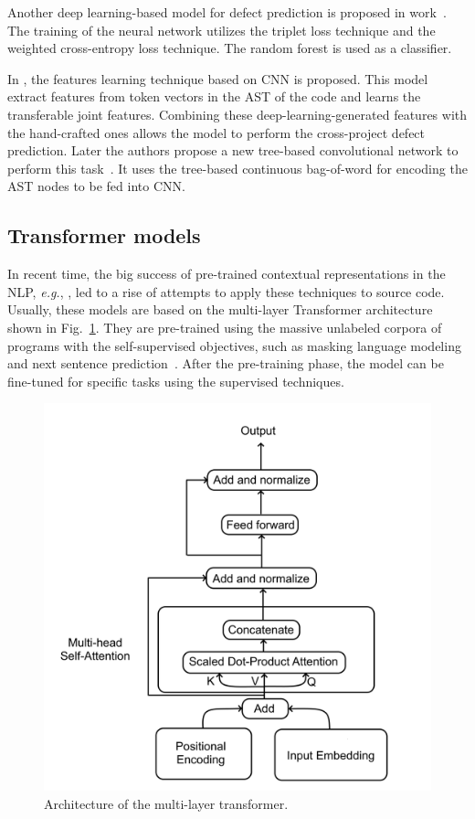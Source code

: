 \documentclass[mathematics,review,submit,moreauthors,pdftex]{Definitions/mdpi}
\begin{document}
Another deep learning-based model for defect prediction is proposed in work~\cite{XuEtAl2019}. The training of the neural network utilizes the triplet loss technique and the weighted cross-entropy loss technique. The random forest is used as a classifier.

In \cite{QiuLuCaiJiang2019}, the features learning technique based on CNN is proposed. This model extract features from token vectors in the AST of the code and learns the transferable joint features. Combining these deep-learning-generated features with the hand-crafted ones allows the model to perform the cross-project defect prediction. Later the authors propose a new tree-based convolutional network to perform this task~\cite{CaiLuQiu2019}. It uses the tree-based continuous bag-of-word for encoding the AST nodes to be fed into CNN.

\subsection{Transformer models}

In recent time, the big success of pre-trained contextual representations in the NLP, \textit{e.g.}, \cite{liu2019roberta}, led to a rise of attempts to apply these techniques to source code. Usually, these models are based on the multi-layer Transformer architecture~\cite{vaswani2017attention} shown in Fig.~\ref{fig5}. They are pre-trained using the massive unlabeled corpora of programs with the self-supervised objectives, such as masking language modeling and next sentence prediction~\cite{KanadeEtAl2019,FengEtAl2020}. After the pre-training phase, the model can be fine-tuned for specific tasks using the supervised techniques.

\begin{figure}[ht] %
\includegraphics[width=10.5 cm]{f5.png}
\caption{Architecture of the multi-layer transformer.}
\label{fig5} %
\end{figure}
\end{document}
